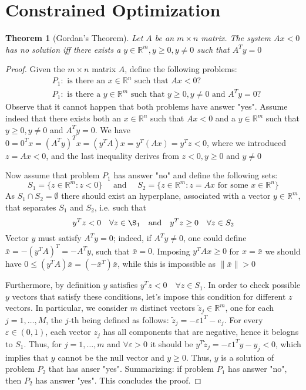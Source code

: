 \documentclass{book}
\newcommand{\R}{\mathbb{R}}
\theoremstyle{theoremv2}
\newtheorem{theorem}{Theorem}[chapter]
\theoremstyle{defv2}
\theoremstyle{remark}
\theoremstyle{remark}
\begin{document}
\section{Constrained Optimization}
\begin{theorem}[Gordan's Theorem]
    \label{Gordan}
    Let $A$ be an $m\times n$ matrix. The system $Ax<0$ has no solution iff there exists a $y\in\R^m,y\geq0,y\neq0$ such that $A^Ty=0$ 
\end{theorem}
\begin{proof}[Proof]
    Given the $m \times n$ matrix $A$, define the following problems: 
   \begin{align*}
       &P_1: \text{ is there an } x\in\R^n \text{ such that } Ax<0?\\
       &P_1: \text{ is there a } y\in\R^m \text{ such that } y\geq0,y\neq0 \text{ and } A^Ty=0?
   \end{align*} 
    Observe that it cannot happen that both problems have answer "yes". Assume indeed that there exists both an $x\in\R^n$ such that $Ax<0$ and a $y\in\R^m$ such that $y\geq0,y\neq0$ and $A^Ty=0$. We have $0=0^Tx=(A^Ty)^Tx=(y^TA)x=y^T(Ax)=y^Tz<0$, where we introduced $z=Ax<0$, and the last inequality derives from $z<0,y\geq0$ and $y\neq0$

    Now assume that problem $P_1$ has answer "no" and define the following sets: 
    \[
        S_1 = \{ z\in\R^m:z<0 \} \quad \text{ and } \quad S_2 = \{ z\in\R^m:z=Ax \text{ for some } x\in\R^n \}
    \]
    As $S_1 \cap S_2= \emptyset$ there should exist an hyperplane, associated with a vector $y\in\R^m$, that separates $S_1$ and $S_2$, i.e. such that 
    \[
        y^Tz <0 \quad \forall z\in\S_1 \quad \text{and} \quad y^Tz\geq 0 \quad \forall z\in S_2
    \]
    Vector $y$ must satisfy $A^Ty=0$; indeed, if $A^Ty\neq0$, one could define $\bar{x}=-(y^TA)^T=-A^Ty$, such that $\bar{x}=0$. Imposing $y^TAx\geq0$ for $x=\bar{x}$ we should have $0\leq(y^TA)\bar{x}=(-\bar{x}^T)\bar{x}$, while this is impossible as $\|\bar{x}\|>0$

    Furthermore, by definition $y$ satisfies $y^Tz<0 \quad \forall z\in S_1$. In order to check possible $y$ vectors that satisfy these conditions, let's impose this condition for different $z$ vectors. In particular, we consider $m$ distinct vectors $\tilde{z}_j\in\R^m$, one for each $j=1,\dots,M$, the $j$-th being defined as follows: $\tilde{z}_j = -\varepsilon1^T-e_j$. For every $\varepsilon\in(0,1)$, each vector $z_j$ has all components that are negative, hence it belogns to $S_1$. Thus, for $j=1,\dots,m$ and $\forall \varepsilon>0$ it should be $y^T\tilde{z}_j = -\varepsilon1^Ty-y_j<0$, which implies that $y$ cannot be the null vector and $y\geq 0$. Thus, $y$ is a solution of problem $P_2$ that has anser "yes". 
    Summarizing: if problem $P_1$ has answer "no", then $P_2$ has answer "yes". This concludes the proof.
\end{proof}
\end{document}
